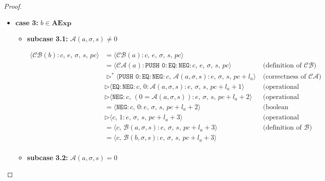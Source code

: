 \documentclass{article}
\begin{document}
\begin{proof}
\begin{itemize}
    \newpage
    \item \textbf{case 3: } $b \in \textbf{AExp}$

     \begin{itemize}
         \item \textbf{subcase 3.1: } $\mathcal{A}(a, \sigma, s) \neq 0$

         \[
          \begin{aligned}
            \langle  \mathcal{CB}(b) : c,\, e,\, \sigma,\, s,\, pc \rangle
            &= \langle \mathcal{CB}(a) : c,\, e,\, \sigma,\, s,\, pc \rangle \\
            &= \langle \mathcal{CA}(a) : \texttt{PUSH 0} : \texttt{EQ} : \texttt{NEG} : c,\, e,\, \sigma,\, s,\, pc \rangle
            && \text{(definition of } \mathcal{CB}\text{)} \\
            &\triangleright^\ast \langle \texttt{PUSH 0} : \texttt{EQ} : \texttt{NEG} : c,\, \mathcal{A}(a, \sigma, s): e,\, \sigma,\, s,\, pc + l_a \rangle
            && \text{(correctness of } \mathcal{CA}\text{)} \\
            &\triangleright \langle \texttt{EQ} : \texttt{NEG} :  c,\, 0 : \mathcal{A}(a, \sigma, s): e,\, \sigma,\, s,\, pc + l_a + 1 \rangle
            && \text{(operational semantics)} \\
            &\triangleright \langle \texttt{NEG} : c,\, (0 = \mathcal{A}(a, \sigma, s)) : e,\, \sigma,\, s,\, pc + l_a + 2 \rangle
            && \text{(operational semantics)} \\
            &= \langle \texttt{NEG} : c,\, 0 : e,\, \sigma,\, s,\, pc + l_a + 2 \rangle
            && \text{(boolean algebra)} \\
            &\triangleright \langle c,\, 1 : e,\, \sigma,\, s,\, pc + l_a + 3 \rangle
            && \text{(operational semantics)} \\
            &= \langle c,\, \mathcal{B}(a, \sigma, s) : e,\, \sigma,\, s,\, pc + l_a + 3 \rangle
            && \text{(definition of } \mathcal{B}\text{)} \\
            &= \langle c,\, \mathcal{B}(b, \sigma, s) : e,\, \sigma,\, s,\, pc + l_a + 3 \rangle
            \\
          \end{aligned}
      \]

         \item \textbf{subcase 3.2: } $\mathcal{A}(a, \sigma, s) = 0$


\end{itemize}
\end{itemize}
\end{proof}
\end{document}
